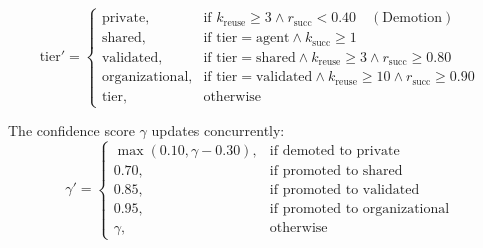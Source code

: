 \documentclass[lettersize,journal]{IEEEtran}
\begin{document}
\begin{equation}
\label{eq:governance_rules}
\text{tier}' = \begin{cases}
\text{private}, & \text{if } k_{\text{reuse}} \ge 3 \land r_{\text{succ}} < 0.40 \quad (\text{Demotion}) \\
\text{shared}, & \text{if } \text{tier} = \text{agent} \land k_{\text{succ}} \ge 1 \\
\text{validated}, & \text{if } \text{tier} = \text{shared} \land k_{\text{reuse}} \ge 3 \land r_{\text{succ}} \ge 0.80 \\
\text{organizational}, & \text{if } \text{tier} = \text{validated} \land k_{\text{reuse}} \ge 10 \land r_{\text{succ}} \ge 0.90 \\
\text{tier}, & \text{otherwise}
\end{cases}
\end{equation}

The confidence score $\gamma$ updates concurrently:
\begin{equation}
\label{eq:confidence_update}
\gamma' = \begin{cases}
\max(0.10, \gamma - 0.30), & \text{if demoted to private} \\
0.70, & \text{if promoted to shared} \\
0.85, & \text{if promoted to validated} \\
0.95, & \text{if promoted to organizational} \\
\gamma, & \text{otherwise}
\end{cases}
\end{equation}
\end{document}
